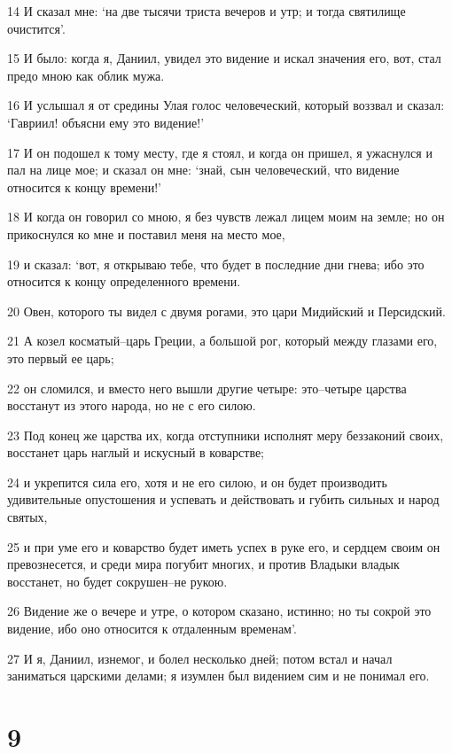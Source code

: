 \par 14 И сказал мне: `на две тысячи триста вечеров и утр; и тогда святилище очистится'.
\par 15 И было: когда я, Даниил, увидел это видение и искал значения его, вот, стал предо мною как облик мужа.
\par 16 И услышал я от средины Улая голос человеческий, который воззвал и сказал: `Гавриил! объясни ему это видение!'
\par 17 И он подошел к тому месту, где я стоял, и когда он пришел, я ужаснулся и пал на лице мое; и сказал он мне: `знай, сын человеческий, что видение относится к концу времени!'
\par 18 И когда он говорил со мною, я без чувств лежал лицем моим на земле; но он прикоснулся ко мне и поставил меня на место мое,
\par 19 и сказал: `вот, я открываю тебе, что будет в последние дни гнева; ибо это относится к концу определенного времени.
\par 20 Овен, которого ты видел с двумя рогами, это цари Мидийский и Персидский.
\par 21 А козел косматый--царь Греции, а большой рог, который между глазами его, это первый ее царь;
\par 22 он сломился, и вместо него вышли другие четыре: это--четыре царства восстанут из этого народа, но не с его силою.
\par 23 Под конец же царства их, когда отступники исполнят меру беззаконий своих, восстанет царь наглый и искусный в коварстве;
\par 24 и укрепится сила его, хотя и не его силою, и он будет производить удивительные опустошения и успевать и действовать и губить сильных и народ святых,
\par 25 и при уме его и коварство будет иметь успех в руке его, и сердцем своим он превознесется, и среди мира погубит многих, и против Владыки владык восстанет, но будет сокрушен--не рукою.
\par 26 Видение же о вечере и утре, о котором сказано, истинно; но ты сокрой это видение, ибо оно относится к отдаленным временам'.
\par 27 И я, Даниил, изнемог, и болел несколько дней; потом встал и начал заниматься царскими делами; я изумлен был видением сим и не понимал его.

\chapter{9}

